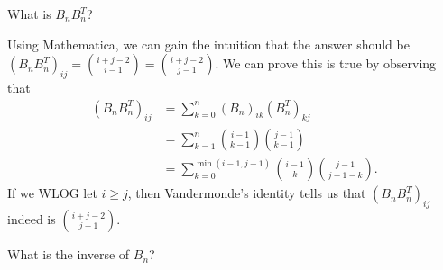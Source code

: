 \documentclass[a4paper, 12pt]{article}
\begin{document}
\begin{question}
    What is \( B_n B_n^T \)?
\end{question}

\begin{idea}
    Using Mathematica, we can gain the intuition that the answer should be \( (B_n B_n^T)_{ij} = \binom{i + j - 2}{i - 1} = \binom{i + j - 2}{j - 1} \). We can prove this is true by observing that
    \begin{align*}
        (B_n B_n^T)_{ij} &= \sum_{k = 0}^{n} (B_n)_{ik} (B_n^T)_{kj} \\
        &= \sum_{k = 1}^{n} \binom{i - 1}{k - 1} \binom{j - 1}{k - 1} \\
        &= \sum_{k = 0}^{\min(i - 1, j - 1)} \binom{i - 1}{k} \binom{j - 1}{j - 1 - k} 
    .\end{align*}
    If we WLOG let \( i \ge j \), then Vandermonde's identity tells us that \( (B_n B_n^T)_{ij} \) indeed is \( \binom{i + j - 2}{j - 1}  \).
\end{idea}

\begin{question}
    What is the inverse of \( B_n \)?
\end{question}
\end{document}
